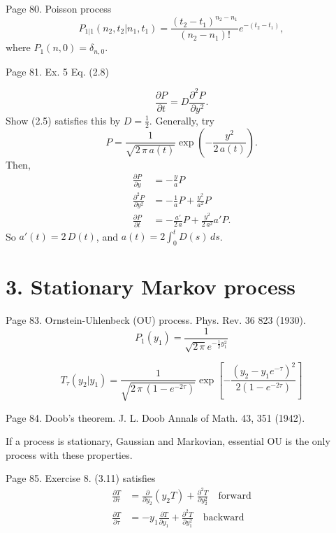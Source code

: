 \documentclass{book}
\numberwithin{equation}{section}
\theoremstyle{plain}
\theoremstyle{definition}
\theoremstyle{remark}
\begin{document}
Page 80.
Poisson process
\begin{equation}
P_{1|1}(n_2, t_2|n_1, t_1)
=
\frac{ (t_2 - t_1)^{n_2 - n_1} } { (n_2 - n_1)! }
e^{ -(t_2 - t_1) },
\tag{2.6}
\end{equation}
where
$P_1(n, 0) = \delta_{n,0}$.

Page 81. Ex. 5 Eq. (2.8)

$$
\frac{ \partial P } { \partial t }
=
D \frac{ \partial^2 P } { \partial y^2 }.
$$
Show (2.5) satisfies this by $D = \frac{1}{2}$.
Generally, try
$$
P = \frac{ 1 } { \sqrt{ 2 \, \pi \, a(t) } }
\exp\left(
  - \frac{ y^2 } { 2 \, a(t) }
\right).
$$
Then,
$$
\begin{aligned}
\frac{ \partial P } { \partial y }
&=
- \frac{ y } { a } P
\\
\frac{ \partial^2 P } { \partial y^2 }
&=
- \frac{1}{a} P
+ \frac{ y^2 } { a^2 } P
\\
\frac{ \partial P } { \partial t }
&=
-\frac{ a' } { 2 \, a } P
+ \frac{ y^2 } { 2 \, a^2 } a' P.
\end{aligned}
$$
So $a'(t) = 2 \, D(t)$,
and
$a(t) = 2 \int^t_0 D(s) \, ds$.


\section{3. Stationary Markov process}

Page 83.
Ornstein-Uhlenbeck (OU) process.
Phys. Rev. 36 823 (1930).
\begin{equation}
P_1(y_1)
=
\frac{1}{\sqrt{2 \, \pi} e^{-\frac 1 2 y_1^2 } }
\tag{3.10}
\end{equation}

\begin{equation}
  T_\tau(y_2 | y_1)
=
\frac{ 1 } { \sqrt{ 2 \, \pi \, (1 - e^{-2\tau}) }  }
\exp\left[
  -\frac{ (y_2 - y_1 e^{-\tau})^2 }
  { 2 ( 1 - e^{-2 \tau } ) }
\right]
\tag{3.11}
\end{equation}

Page 84.
Doob's theorem.
J. L. Doob Annals of Math. 43, 351 (1942).

If a process is stationary, Gaussian and Markovian,
essential OU is the only process with these properties.

Page 85.
Exercise 8. (3.11) satisfies
\begin{align}
\frac{ \partial T } { \partial \tau }
&=
\frac{ \partial } { \partial y_2 } \left( y_2 T \right)
+
\frac{ \partial^2 T } { \partial y_2^2 }
\quad \mathrm{forward}
\tag{3.20}
\\
\frac{ \partial T } { \partial \tau }
&=
-y_1 \frac{ \partial T } { \partial y_1 }
+
\frac{ \partial^2 T } { \partial y_1^2 }
\quad \mathrm{backward}
\tag{3.21}
\end{align}
\end{document}
